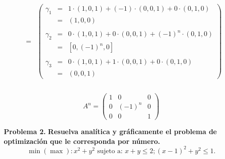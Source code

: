 \begin{enumerate}
$$\begin{array}{rcl}
	&=&
	\left(\begin{array}{rcl}
	    \gamma_1 &=& 1\cdot(1,0,1)+(-1)\cdot(0,0,1)+0\cdot(0,1,0)\\
		     &=&(1,0,0)\\\\
	    \gamma_2 &=& 0\cdot(1,0,1)+0\cdot(0,0,1)+(-1)^n\cdot(0,1,0)\\
		     &=&\left[0,(-1)^n,0\right]\\\\
	    \gamma_3 &=& 0\cdot(1,0,1)+1\cdot(0,0,1)+0\cdot(0,1,0)\\
		     &=&(0,0,1)
	\end{array}\right)\\\\
    \end{array}$$
    
    \begin{tcolorbox}
	$$A^n = \left(\begin{array}{*{3}{r}}
	    1 & 0 & 0 \\
	    0 & (-1)^n & 0 \\
	    0 & 0 & 1
	\end{array}\right)$$
    \end{tcolorbox}
    \vspace{1cm}




    \item [\bfseries Problema 2.] \textbf{Resuelva analítica y gráficamente el problema de optimización que le corresponda por número.}\\

	$$\min(\max):x^2+y^2\mbox{ sujeto a: } x+y\leq 2; (x-1)^2+y^2\leq 1.$$\\

	\begin{comment}

	\begin{enumerate}[\bfseries a)]

	    \item $\min f(x,y,z)$.\\\\
		\textbf{Respuesta.-}\; Vemos que el dominio de definición es $\mathbb{R}^3$, es abierto y $f$ es de clase $1$  en $\mathbb{R}^3$.\\\\

		Ahora calculamos las derivadas parciales de cada variable.\\


\end{comment}
\end{enumerate}
